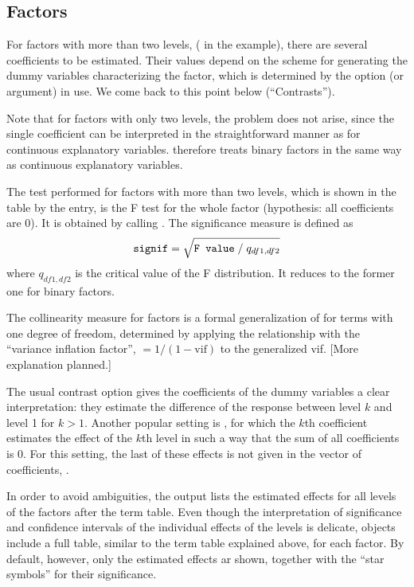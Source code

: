 \documentclass[11pt]{article}\usepackage[]{graphicx}\usepackage[]{color}
\begin{document}
\subsection{Factors}
For factors with more than two levels, ( in the example), there
are several coefficients to be estimated. 
Their values depend on the scheme for generating the 
dummy variables characterizing the factor, which is determined 
by the  option (or argument) in use.
We come back to this point below (``Contrasts'').

Note that for factors with only two levels, the problem does not arise,
since the single 
coefficient can be interpreted in the straightforward manner as 
for continuous explanatory variables.  therefore treats binary
factors in the same way as continuous explanatory variables.

The test performed for factors with more than two levels, which is shown 
in the  table by the  entry, 
is the F test for the whole factor (hypothesis: all coefficients are 0). 
It is obtained by calling .
The significance measure is defined as 
\[
  \texttt{signif} = \sqrt{\texttt{F value}\;/\;q_{df1,df2}}
\]
where $q_{df1,df2}$ is the critical value of the F distribution.
It reduces to the former one for binary factors.

The collinearity measure  for factors is a formal generalization of 
 for terms with one degree of freedom, determined by applying
the relationship with the ``variance inflation factor'',
$=1/(1-\mbox{vif})$ to the generalized vif. 
[More explanation planned.]

The usual contrast option  gives the coefficients of the dummy variables 
a clear interpretation: 
they estimate the difference of the response between level $k$ and 
level 1 for $k>1$.
Another popular setting is , for which the $k$th coefficient estimates the effect 
of the $k$th level in such a way that the sum of all coefficients is 0.
For this setting, the last of these effects is not given in the
vector of coefficients, .

In order to avoid ambiguities, the  output lists the 
estimated effects for all levels of the factors after the term table.
Even though the interpretation of significance and confidence intervals of
the individual effects of the levels is delicate,  objects include
a full table, similar to the term table explained above, for each factor.
By default, however, only the estimated effects ar shown, together with the
``star symbols'' for their significance.
\end{document}
